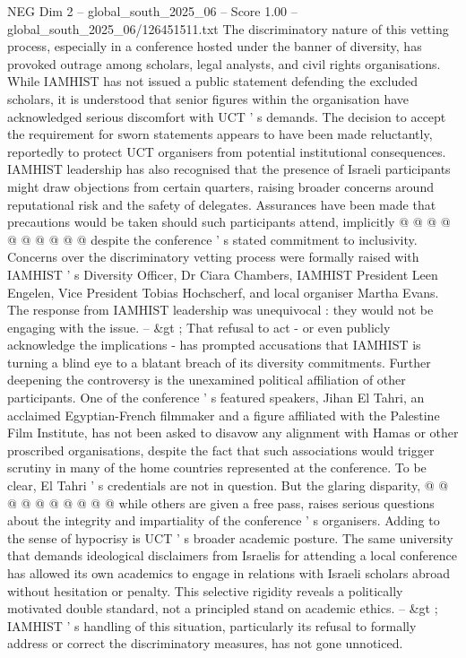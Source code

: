 \begin{textsample}{NEG Dim 2 – global\_south\_2025\_06 – Score 1.00 – global\_south\_2025\_06/126451511.txt}
The discriminatory nature of this vetting process, especially in a conference hosted under the banner of diversity, has provoked outrage among scholars, legal analysts, and civil rights organisations.
While IAMHIST has not issued a public statement defending the excluded scholars, it is understood that senior figures within the organisation have acknowledged serious discomfort with UCT ' s demands.
The decision to accept the requirement for sworn statements appears to have been made reluctantly, reportedly to protect UCT organisers from potential institutional consequences.
IAMHIST leadership has also recognised that the presence of Israeli participants might draw objections from certain quarters, raising broader concerns around reputational risk and the safety of delegates.
Assurances have been made that precautions would be taken should such participants attend, implicitly @ @ @ @ @ @ @ @ @ @ despite the conference ' s stated commitment to inclusivity.
Concerns over the discriminatory vetting process were formally raised with IAMHIST ' s Diversity Officer, Dr Ciara Chambers, IAMHIST President Leen Engelen, Vice President Tobias Hochscherf, and local organiser Martha Evans.
The response from IAMHIST leadership was unequivocal : they would not be engaging with the issue. -- \&gt ; That refusal to act - or even publicly acknowledge the implications - has prompted accusations that IAMHIST is turning a blind eye to a blatant breach of its diversity commitments.
Further deepening the controversy is the unexamined political affiliation of other participants.
One of the conference ' s featured speakers, Jihan El Tahri, an acclaimed Egyptian-French filmmaker and a figure affiliated with the Palestine Film Institute, has not been asked to disavow any alignment with Hamas or other proscribed organisations, despite the fact that such associations would trigger scrutiny in many of the home countries represented at the conference.
To be clear, El Tahri ' s credentials are not in question.
But the glaring disparity, @ @ @ @ @ @ @ @ @ @ while others are given a free pass, raises serious questions about the integrity and impartiality of the conference ' s organisers.
Adding to the sense of hypocrisy is UCT ' s broader academic posture.
The same university that demands ideological disclaimers from Israelis for attending a local conference has allowed its own academics to engage in relations with Israeli scholars abroad without hesitation or penalty.
This selective rigidity reveals a politically motivated double standard, not a principled stand on academic ethics. -- \&gt ; IAMHIST ' s handling of this situation, particularly its refusal to formally address or correct the discriminatory measures, has not gone unnoticed.

\end{textsample}
